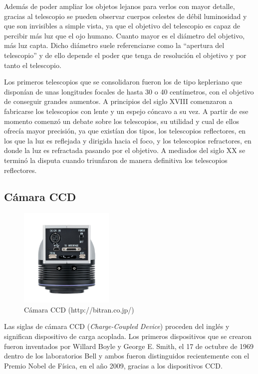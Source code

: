 Además de poder ampliar los objetos lejanos para verlos con mayor detalle, gracias al telescopio se pueden observar cuerpos celestes de débil luminosidad y que son invisibles a simple vista, ya que el objetivo del telescopio es capaz de percibir más luz que el ojo humano. Cuanto mayor es el diámetro del objetivo, más luz capta. Dicho diámetro suele referenciarse como la “apertura del telescopio” y de ello depende el poder que tenga de resolución el objetivo y por tanto el telescopio.

Los primeros telescopios que se consolidaron fueron los de tipo kepleriano que disponían de unas longitudes focales de hasta 30 o 40 centímetros, con el objetivo de conseguir grandes aumentos.
A principios del siglo XVIII comenzaron a fabricarse los telescopios con lente y un espejo cóncavo a su vez. A partir de ese momento comenzó un debate sobre los telescopios, su utilidad y cual de ellos ofrecía mayor precisión, ya que existían dos tipos, los telescopios reflectores, en los que la luz es reflejada y dirigida hacia el foco, y los telescopios refractores, en donde  la luz es refractada pasando por el objetivo.
A mediados del siglo XX se terminó la disputa cuando triunfaron de manera definitiva los telescopios reflectores.

\subsection{Cámara CCD}
\begin{figure}[htb]
\centering
\includegraphics[width=0.4\textwidth]{./imagenes/ccd}
\caption{Cámara CCD (http://bitran.co.jp/)} \label{fig:ccd}
\end{figure}
Las siglas de cámara CCD (\textit{Charge-Coupled Device}) proceden del inglés y significan dispositivo de carga acoplada. Los primeros dispositivos que se crearon fueron inventados por Willard Boyle y George E. Smith, el 17 de octubre de 1969 dentro de los laboratorios Bell y ambos fueron distinguidos recientemente con el Premio Nobel de Física, en el año 2009, gracias a los dispositivos CCD.

